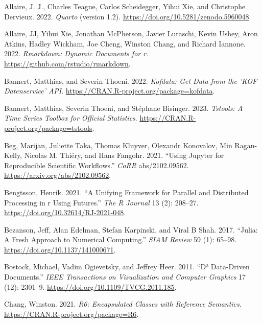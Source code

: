 \documentclass[
  12pt,
  letterpaper,
]{krantz}
\newlength{\cslhangindent}
\newlength{\cslentryspacingunit} %
\newenvironment{CSLReferences}[2] %
 {%
  \setlength{\parindent}{0pt}
  \ifodd #1
  \let\oldpar\par
  \def\par{\hangindent=\cslhangindent\oldpar}
  \fi
  \setlength{\parskip}{#2\cslentryspacingunit}
 }%
 {}
\begin{document}
\hypertarget{refs}{}
\begin{CSLReferences}{1}{0}
\leavevmode{}%
Allaire, J. J., Charles Teague, Carlos Scheidegger, Yihui Xie, and
Christophe Dervieux. 2022. \emph{{Quarto}} (version 1.2).
\url{https://doi.org/10.5281/zenodo.5960048}.

\leavevmode{}%
Allaire, JJ, Yihui Xie, Jonathan McPherson, Javier Luraschi, Kevin
Ushey, Aron Atkins, Hadley Wickham, Joe Cheng, Winston Chang, and
Richard Iannone. 2022. \emph{Rmarkdown: Dynamic Documents for r}.
\url{https://github.com/rstudio/rmarkdown}.

\leavevmode{}%
Bannert, Matthias, and Severin Thoeni. 2022. \emph{Kofdata: Get Data
from the 'KOF Datenservice' API}.
\url{https://CRAN.R-project.org/package=kofdata}.

\leavevmode{}%
Bannert, Matthias, Severin Thoeni, and Stéphane Bisinger. 2023.
\emph{Tstools: A Time Series Toolbox for Official Statistics}.
\url{https://CRAN.R-project.org/package=tstools}.

\leavevmode{}%
Beg, Marijan, Juliette Taka, Thomas Kluyver, Olexandr Konovalov, Min
Ragan-Kelly, Nicolas M. Thiéry, and Hans Fangohr. 2021. {``Using Jupyter
for Reproducible Scientific Workflows.''} \emph{CoRR} abs/2102.09562.
\url{https://arxiv.org/abs/2102.09562}.

\leavevmode{}%
Bengtsson, Henrik. 2021. {``A Unifying Framework for Parallel and
Distributed Processing in r Using Futures.''} \emph{The R Journal} 13
(2): 208--27. \url{https://doi.org/10.32614/RJ-2021-048}.

\leavevmode{}%
Bezanson, Jeff, Alan Edelman, Stefan Karpinski, and Viral B Shah. 2017.
{``Julia: A Fresh Approach to Numerical Computing.''} \emph{SIAM Review}
59 (1): 65--98. \url{https://doi.org/10.1137/141000671}.

\leavevmode{}%
Bostock, Michael, Vadim Ogievetsky, and Jeffrey Heer. 2011. {``D³
Data-Driven Documents.''} \emph{IEEE Transactions on Visualization and
Computer Graphics} 17 (12): 2301--9.
\url{https://doi.org/10.1109/TVCG.2011.185}.

\leavevmode{}%
Chang, Winston. 2021. \emph{R6: Encapsulated Classes with Reference
Semantics}. \url{https://CRAN.R-project.org/package=R6}.


\end{CSLReferences}
\end{document}
